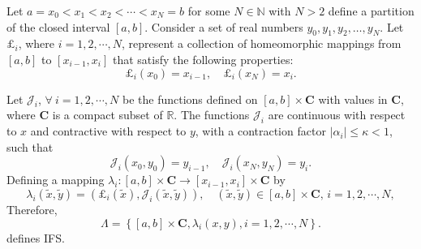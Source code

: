 \documentclass{article}[12pt, a4]
\begin{document}
	Let \( a=x_0 < x_1 < x_2 < \cdots < x_N=b \) for some \( N \in \mathbb{N} \) with \( N > 2 \) define a partition of the closed interval \([a, b]\). Consider a set of real numbers \( y_0, y_1, y_2, \ldots, y_N \). Let \( \pounds_i \), where \( i =1,2,\cdots,N \), represent a collection of homeomorphic mappings from \([a, b]\) to \([x_{i-1}, x_i]\) that satisfy the following properties:
	\begin{equation}\label{ln}
		\pounds_{i}\left(x_{0}\right)=x_{i-1}, \quad \pounds_{i}\left(x_{N}\right)=x_{i}.
	\end{equation}
	
	
	Let \( \mathcal{J}_i \), \(\forall ~  i =1,2,\cdots,N\) be the functions defined on \( [a, b] \times \mathbf{C} \) with values in \(\mathbf{C}\), where \(\mathbf{C}\) is a compact subset of \( \mathbb{R} \). The functions \( \mathcal{J}_{i} \) are continuous with respect to \( x \) and contractive with respect to \( y \), with a contraction factor \(|\alpha_i| \leq \kappa < 1 \), such that
	\begin{equation}\label{fn}
		\mathcal{J}_{i}\left(x_{0}, y_{0}\right)=y_{i-1}, \quad \mathcal{J}_{i}\left(x_{N}, y_{N}\right)=y_{i}.
	\end{equation}
	Defining a mapping \(\lambda_{i}: [a,b] \times\mathbf{C}\to [x_{i-1},x_i] \times \mathbf{C}\) by  
	\begin{equation*}
		\lambda_{i}(\tilde{x}, \tilde{y}) = \left(\pounds_i(\tilde{x}), \mathcal{J}_{i}(\tilde{x}, \tilde{y})\right), \quad (\tilde{x}, \tilde{y}) \in [a,b] \times \mathbf{C}, \, i =1,2,\cdots,N, 
	\end{equation*}
	Therefore, 
	\begin{equation}\label{ifs00}
		\Lambda = \left\{[a,b] \times \mathbf{C}, \lambda_{i}(x, y) , i =1,2,\cdots,N\right\}.
	\end{equation}
	defines IFS.
	
\end{document}
